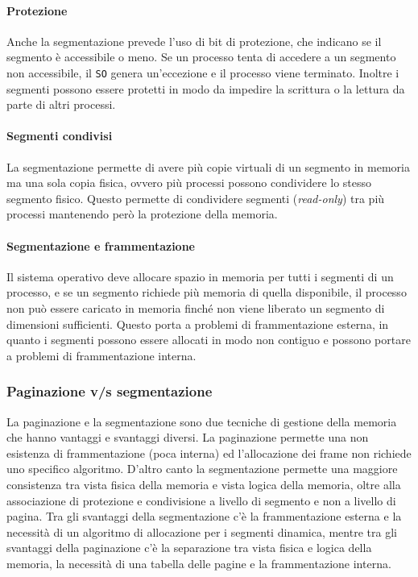     \paragraph{Protezione}
        Anche la segmentazione prevede l'uso di bit di protezione, che indicano se il segmento è accessibile o meno. Se un processo tenta di accedere a un segmento non accessibile, il \texttt{SO} genera un'eccezione e il processo viene terminato. Inoltre i segmenti possono essere protetti in modo da impedire la scrittura o la lettura da parte di altri processi.
    \paragraph{Segmenti condivisi}
        La segmentazione permette di avere più copie virtuali di un segmento in memoria ma una sola copia fisica, ovvero più processi possono condividere lo stesso segmento fisico. Questo permette di condividere segmenti (\textit{read-only}) tra più processi mantenendo però la protezione della memoria.
    \paragraph{Segmentazione e frammentazione}
        Il sistema operativo deve allocare spazio in memoria per tutti i segmenti di un processo, e se un segmento richiede più memoria di quella disponibile, il processo non può essere caricato in memoria finché non viene liberato un segmento di dimensioni sufficienti. Questo porta a problemi di frammentazione esterna, in quanto i segmenti possono essere allocati in modo non contiguo e possono portare a problemi di frammentazione interna.
    \subsubsection{Paginazione v/s segmentazione}
        La paginazione e la segmentazione sono due tecniche di gestione della memoria che hanno vantaggi e svantaggi diversi. La paginazione permette una non esistenza di frammentazione (poca interna) ed l'allocazione dei frame non richiede uno specifico algoritmo. D'altro canto la segmentazione permette una maggiore consistenza tra vista fisica della memoria e vista logica della memoria, oltre alla associazione di protezione e condivisione a livello di segmento e non a livello di pagina. Tra gli svantaggi della segmentazione c'è la frammentazione esterna e la necessità di un algoritmo di allocazione per i segmenti dinamica, mentre tra gli svantaggi della paginazione c'è la separazione tra vista fisica e logica della memoria, la necessità di una tabella delle pagine e la frammentazione interna.
